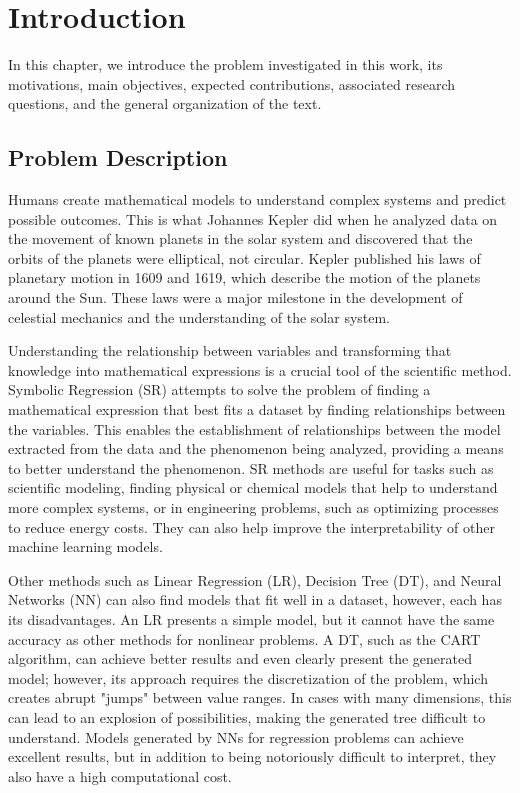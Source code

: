 \chapter{Introduction}

In this chapter, we introduce the problem investigated in this work, its motivations, main objectives, expected contributions, associated research questions, and the general organization of the text.

\section{Problem Description}

Humans create mathematical models to understand complex systems and predict possible outcomes. This is what Johannes Kepler did when he analyzed data on the movement of known planets in the solar system and discovered that the orbits of the planets were elliptical, not circular. Kepler published his laws of planetary motion in 1609 and 1619, which describe the motion of the planets around the Sun. These laws were a major milestone in the development of celestial mechanics and the understanding of the solar system.

Understanding the relationship between variables and transforming that knowledge into mathematical expressions is a crucial tool of the scientific method. Symbolic Regression (SR) attempts to solve the problem of finding a mathematical expression that best fits a dataset by finding relationships between the variables. This enables the establishment of relationships between the model extracted from the data and the phenomenon being analyzed, providing a means to better understand the phenomenon. SR methods are useful for tasks such as scientific modeling, finding physical or chemical models that help to understand more complex systems, or in engineering problems, such as optimizing processes to reduce energy costs. They can also help improve the interpretability of other machine learning models.

Other methods such as Linear Regression (LR), Decision Tree (DT), and Neural Networks (NN) can also find models that fit well in a dataset, however, each has its disadvantages. An LR presents a simple model, but it cannot have the same accuracy as other methods for nonlinear problems. A DT, such as the CART algorithm, can achieve better results and even clearly present the generated model; however, its approach requires the discretization of the problem, which creates abrupt "jumps" between value ranges. In cases with many dimensions, this can lead to an explosion of possibilities, making the generated tree difficult to understand. Models generated by NNs for regression problems can achieve excellent results, but in addition to being notoriously difficult to interpret, they also have a high computational cost.

